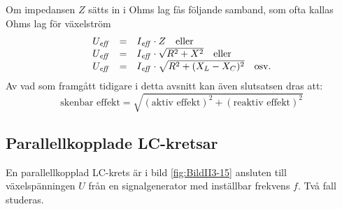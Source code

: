 Om impedansen \(Z\) sätts in i Ohms lag fås följande samband, som ofta kallas
Ohms lag för växelström
\[
\begin{array}{rcl}
  U_{\it eff} &=& I_{\it eff} \cdot Z \quad \text{eller} \\
  U_{\it eff} &=& I_{\it eff} \cdot \sqrt{R^2 + X^2} \quad \text{eller} \\
  U_{\it eff} &=& I_{\it eff} \cdot \sqrt{R^2 + (X_L - X_C)^2} \quad \text{osv.}
\end{array}
\]
Av vad som framgått tidigare i detta avsnitt kan även slutsatsen dras att:
%
\[
\text{skenbar effekt} = \sqrt{(\text{aktiv effekt})^2 + (\text{reaktiv effekt})^2}
\]
%
\subsection{Parallellkopplade LC-kretsar}



En parallellkopplad LC-krets är i bild \ref{fig:BildII3-15} ansluten till
växelspänningen \(U\) från en signalgenerator med inställbar frekvens \(f\).
Två fall studeras.

